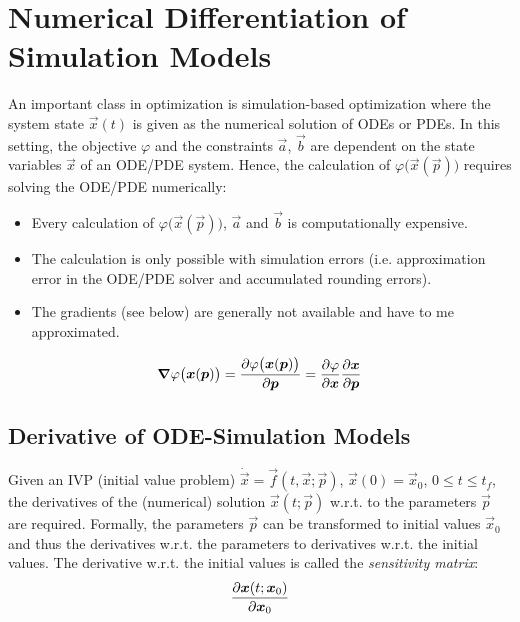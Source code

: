 	\section{Numerical Differentiation of Simulation Models}
		An important class in optimization is simulation-based optimization where the system state \( \vec{x}(t) \) is given as the numerical solution of ODEs or PDEs. In this setting, the objective \(\varphi\) and the constraints \(\vec{a}\), \(\vec{b}\) are dependent on the state variables \(\vec{x}\) of an ODE/PDE system. Hence, the calculation of \( \varphi\big(\vec{x}(\vec{p})\big) \) requires solving the ODE/PDE numerically:
		\begin{itemize}
			\item Every calculation of \( \varphi\big(\vec{x}(\vec{p})\big) \), \(\vec{a}\) and \(\vec{b}\) is computationally expensive.
			\item The calculation is only possible with simulation errors (i.e. approximation error in the ODE/PDE solver and accumulated rounding errors).
			\item The gradients (see below) are generally not available and have to me approximated.
		\end{itemize}
		\begin{align*}
			\grad{\varphi}\big(\bm{x}(\bm{p})\big) = \pdv{\varphi\big(\bm{x}(\bm{p})\big)}{\bm{p}} = \pdv{\varphi}{\bm{x}} \pdv{\bm{x}}{\bm{p}}
		\end{align*}

		\subsection{Derivative of ODE-Simulation Models}
			\label{subsec:derivativeOde}

			Given an IVP (initial value problem) \( \dot{\vec{x}} = \vec{f}(t, \vec{x}; \vec{p}) \), \( \vec{x}(0) = \vec{x}_0 \), \( 0 \leq t \leq t_f \), the derivatives of the (numerical) solution \( \vec{x}(t; \vec{p}) \) w.r.t. to the parameters \( \vec{p} \) are required. Formally, the parameters \(\vec{p}\) can be transformed to initial values \(\vec{x}_0\) and thus the derivatives w.r.t. the parameters to derivatives w.r.t. the initial values. The derivative w.r.t. the initial values is called the \emph{sensitivity matrix}:
			\begin{align*}
				\pdv{\bm{x}(t; \bm{x}_0)}{\bm{x}_0}
			\end{align*}


